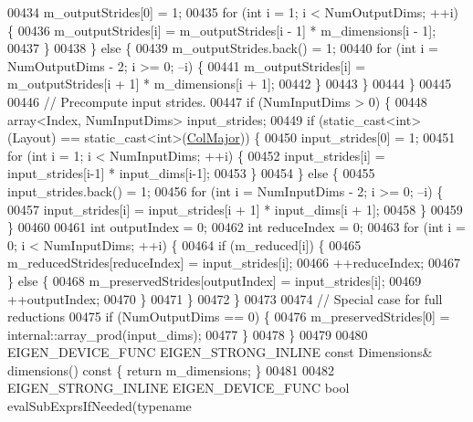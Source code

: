 \begin{DoxyCode}
00434         m\_outputStrides[0] = 1;
00435         \textcolor{keywordflow}{for} (\textcolor{keywordtype}{int} i = 1; i < NumOutputDims; ++i) \{
00436           m\_outputStrides[i] = m\_outputStrides[i - 1] * m\_dimensions[i - 1];
00437         \}
00438       \} \textcolor{keywordflow}{else} \{
00439         m\_outputStrides.back() = 1;
00440         \textcolor{keywordflow}{for} (\textcolor{keywordtype}{int} i = NumOutputDims - 2; i >= 0; --i) \{
00441           m\_outputStrides[i] = m\_outputStrides[i + 1] * m\_dimensions[i + 1];
00442         \}
00443       \}
00444     \}
00445 
00446     \textcolor{comment}{// Precompute input strides.}
00447     \textcolor{keywordflow}{if} (NumInputDims > 0) \{
00448       array<Index, NumInputDims> input\_strides;
00449       \textcolor{keywordflow}{if} (static\_cast<int>(Layout) == static\_cast<int>(\hyperlink{group__enums_ggaacded1a18ae58b0f554751f6cdf9eb13a0cbd4bdd0abcfc0224c5fcb5e4f6669a}{ColMajor})) \{
00450         input\_strides[0] = 1;
00451         \textcolor{keywordflow}{for} (\textcolor{keywordtype}{int} i = 1; i < NumInputDims; ++i) \{
00452           input\_strides[i] = input\_strides[i-1] * input\_dims[i-1];
00453         \}
00454       \} \textcolor{keywordflow}{else} \{
00455         input\_strides.back() = 1;
00456         \textcolor{keywordflow}{for} (\textcolor{keywordtype}{int} i = NumInputDims - 2; i >= 0; --i) \{
00457           input\_strides[i] = input\_strides[i + 1] * input\_dims[i + 1];
00458         \}
00459       \}
00460 
00461       \textcolor{keywordtype}{int} outputIndex = 0;
00462       \textcolor{keywordtype}{int} reduceIndex = 0;
00463       \textcolor{keywordflow}{for} (\textcolor{keywordtype}{int} i = 0; i < NumInputDims; ++i) \{
00464         \textcolor{keywordflow}{if} (m\_reduced[i]) \{
00465           m\_reducedStrides[reduceIndex] = input\_strides[i];
00466           ++reduceIndex;
00467         \} \textcolor{keywordflow}{else} \{
00468           m\_preservedStrides[outputIndex] = input\_strides[i];
00469           ++outputIndex;
00470         \}
00471       \}
00472     \}
00473 
00474     \textcolor{comment}{// Special case for full reductions}
00475     \textcolor{keywordflow}{if} (NumOutputDims == 0) \{
00476       m\_preservedStrides[0] = internal::array\_prod(input\_dims);
00477     \}
00478   \}
00479 
00480   EIGEN\_DEVICE\_FUNC EIGEN\_STRONG\_INLINE \textcolor{keyword}{const} Dimensions& dimensions()\textcolor{keyword}{ const }\{ \textcolor{keywordflow}{return} m\_dimensions; \}
00481 
00482   EIGEN\_STRONG\_INLINE EIGEN\_DEVICE\_FUNC \textcolor{keywordtype}{bool} evalSubExprsIfNeeded(\textcolor{keyword}{typename} 

\end{DoxyCode}
